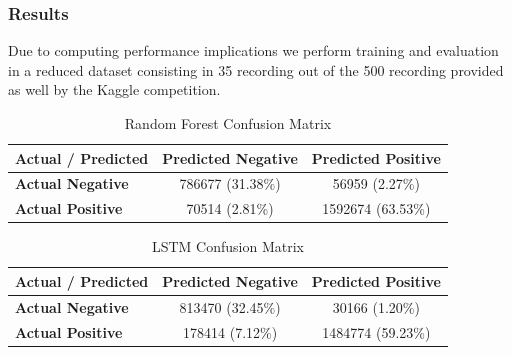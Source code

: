 \documentclass[10pt]{beamer}
\begin{document}
\begin{frame}
    \frametitle{Results}
    \begin{block}{}
        Due to computing performance implications we perform training and evaluation in a reduced dataset consisting in 35 recording out of the 500 recording provided as well by the Kaggle competition.
    \end{block}
    
    \begin{block}{}
        \begin{table}[h]
            \centering
            \caption{Random Forest Confusion Matrix}
            \label{tab:random_forest_confusion_matrix}
            \begin{tabular}{lcc}
                \hline
                \textbf{Actual / Predicted} & \textbf{Predicted Negative} & \textbf{Predicted Positive} \\
                \hline
                \textbf{Actual Negative} & 786677 (31.38\%) & 56959 (2.27\%) \\
                \textbf{Actual Positive} & 70514 (2.81\%) & 1592674 (63.53\%) \\
                \hline
            \end{tabular}
        \end{table}

        \begin{table}[h]
            \centering
            \caption{LSTM Confusion Matrix}
            \label{tab:lstm_confusion_matrix}
            \begin{tabular}{lcc}
                \hline
                \textbf{Actual / Predicted} & \textbf{Predicted Negative} & \textbf{Predicted Positive} \\
                \hline
                \textbf{Actual Negative} & 813470 (32.45\%) & 30166 (1.20\%) \\
                \textbf{Actual Positive} & 178414 (7.12\%) & 1484774 (59.23\%) \\
                \hline
            \end{tabular}
        \end{table}
    \end{block} 
\end{frame}
\end{document}
